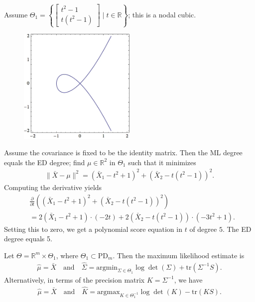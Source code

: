 \begin{eg}
  Assume \( \Theta_1 = \left\{ \begin{bmatrix}t^2 - 1\\ t(t^2 - 1)\end{bmatrix} \mid t \in \mathbb{R} \right\} \); this is a nodal cubic.
  \begin{figure}[H]
    \centering
    \includegraphics*[width=0.5\textwidth]{assets/nodal-cubic.jpg}
  \end{figure}
  Assume the covariance is fixed to be the identity matrix. Then the ML degree equals the ED degree; find \( \mu \in \mathbb{R}^2 \) in \( \Theta_1 \) such that it minimizes
  \begin{align*}
    \lVert \bar X - \mu \rVert^2 = (\bar X_1 - t^2 + 1)^2 + (\bar X_2 - t(t^2 - 1))^2.
  \end{align*}
  Computing the derivative yields 
  \begin{align*}
    &\frac{\partial}{\partial t} \left((\bar X_1 - t^2 + 1)^2 + (\bar X_2 - t(t^2 - 1))^2\right) \\&= 2(\bar X_1 - t^2 + 1) \cdot (-2t) + 2(\bar X_2 - t(t^2 - 1)) \cdot (-3t^2 + 1).
  \end{align*}
  Setting this to zero, we get a polynomial score equation in \( t \) of degree \( 5 \). The ED degree equals 5.
\end{eg}

\begin{mdframed}
\begin{prop}
  Let \( \Theta = \mathbb R^m \times \Theta_1 \), where \( \Theta_1 \subset \mathrm{PD}_m \). Then the maximum likelihood estimate is
  \begin{align*}
    \hat \mu = \bar X \quad \text{and} \quad \hat \Sigma = \mathrm{argmin}_{\Sigma \in \Theta_1} \log\det(\Sigma) + \mathrm{tr}(\Sigma^{-1}S).
  \end{align*}
  Alternatively, in terms of the precision matrix \( K = \Sigma^{-1} \), we have
  \begin{align*}
    \hat \mu = \bar X \quad \text{and} \quad \hat K = \mathrm{argmax}_{K \in \Theta_1^{-1}} \log\det(K) - \mathrm{tr}(KS).
  \end{align*}
\end{prop}
\end{mdframed}

